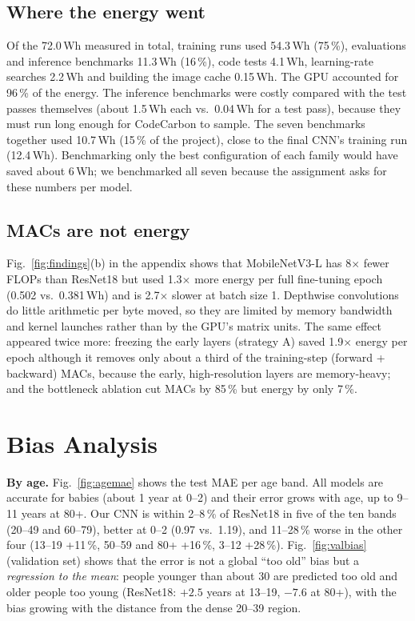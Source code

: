 \documentclass[conference,a4paper]{IEEEtran}
\begin{document}
\subsection{Where the energy went}
Of the 72.0\,Wh measured in total, training runs used 54.3\,Wh (75\,\%), evaluations and inference benchmarks 11.3\,Wh (16\,\%), code tests 4.1\,Wh, learning-rate searches 2.2\,Wh and building the image cache 0.15\,Wh. The GPU accounted for 96\,\% of the energy. The inference benchmarks were costly compared with the test passes themselves (about 1.5\,Wh each vs.\ 0.04\,Wh for a test pass), because they must run long enough for CodeCarbon to sample. The seven benchmarks together used 10.7\,Wh (15\,\% of the project), close to the final CNN's training run (12.4\,Wh). Benchmarking only the best configuration of each family would have saved about 6\,Wh; we benchmarked all seven because the assignment asks for these numbers per model.

\subsection{MACs are not energy}
Fig.~\ref{fig:findings}(b) in the appendix shows that MobileNetV3-L has 8$\times$ fewer FLOPs than ResNet18 but used 1.3$\times$ more energy per full fine-tuning epoch (0.502 vs.\ 0.381\,Wh) and is 2.7$\times$ slower at batch size 1. Depthwise convolutions do little arithmetic per byte moved, so they are limited by memory bandwidth and kernel launches rather than by the GPU's matrix units. The same effect appeared twice more: freezing the early layers (strategy A) saved 1.9$\times$ energy per epoch although it removes only about a third of the training-step (forward + backward) MACs, because the early, high-resolution layers are memory-heavy; and the bottleneck ablation cut MACs by 85\,\% but energy by only 7\,\%.

\section{Bias Analysis}
\label{sec:bias}
\textbf{By age.} Fig.~\ref{fig:agemae} shows the test MAE per age band. All models are accurate for babies (about 1 year at 0--2) and their error grows with age, up to 9--11 years at 80+. Our CNN is within 2--8\,\% of ResNet18 in five of the ten bands (20--49 and 60--79), better at 0--2 (0.97 vs.\ 1.19), and 11--28\,\% worse in the other four (13--19 +11\,\%, 50--59 and 80+ +16\,\%, 3--12 +28\,\%). Fig.~\ref{fig:valbias} (validation set) shows that the error is not a global ``too old'' bias but a \emph{regression to the mean}: people younger than about 30 are predicted too old and older people too young (ResNet18: $+2.5$ years at 13--19, $-7.6$ at 80+), with the bias growing with the distance from the dense 20--39 region.
\end{document}
